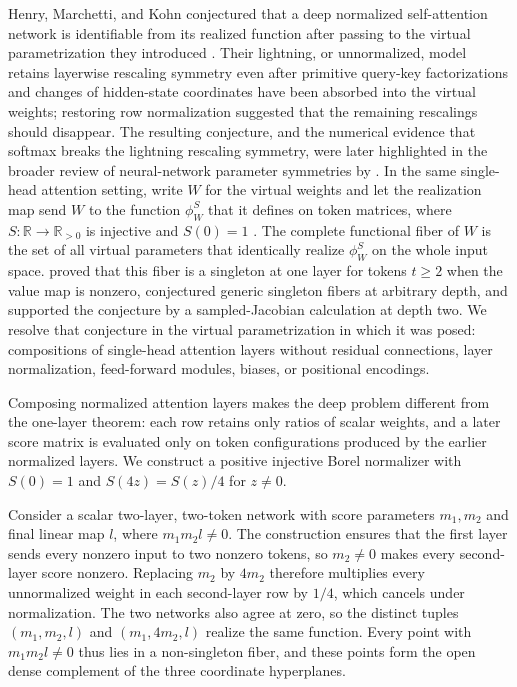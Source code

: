 \documentclass[mlmain]{jmlr}
\newcommand{\R}{\mathbb{R}}
\begin{document}
Henry, Marchetti, and Kohn conjectured that a deep normalized self-attention
network is identifiable from its realized function after passing to the
virtual parametrization they introduced \citep{henry2025}.  Their lightning,
or unnormalized, model retains layerwise rescaling symmetry even after primitive
query-key factorizations and changes of hidden-state coordinates have been
absorbed into the virtual weights; restoring row normalization suggested that
the remaining rescalings should disappear.  The resulting conjecture, and the
numerical evidence that softmax breaks the lightning rescaling symmetry, were later
highlighted in the broader review of neural-network parameter symmetries by
\citet{zhao2025}.  
In the same single-head attention setting, write
$W$ for the virtual weights and let the realization map send $W$ to the function
$\phi_W^S$ that it defines on token matrices, where
$S:\R\to\R_{>0}$ is injective and $S(0)=1$ \citep{henry2025}.  The complete functional fiber of
$W$ is the set of all virtual parameters that identically realize $\phi_W^S$ on the
whole input space.  \citet{henry2025} proved that this
fiber is a singleton at one layer for tokens $t\ge2$ when the value map is nonzero,
conjectured generic singleton fibers at arbitrary depth, and supported the
conjecture by a sampled-Jacobian calculation at depth two.  We
resolve that conjecture in the virtual parametrization in which it was posed:
compositions of single-head attention layers without residual connections,
layer normalization, feed-forward modules, biases, or positional encodings.

Composing normalized attention layers makes the deep problem different from
the one-layer theorem: each row retains only ratios of scalar weights, and a
later score matrix is evaluated only on token configurations produced by the
earlier normalized layers.  We construct a positive injective Borel normalizer
with $S(0)=1$ and $S(4z)=S(z)/4$ for $z\ne0$.  

Consider a scalar two-layer,
two-token network with score parameters $m_1,m_2$ and final linear map $l$,
where $m_1m_2l\ne0$.  The construction ensures that the first layer sends
every nonzero input to two nonzero tokens, so $m_2\ne0$ makes every
second-layer score nonzero.  Replacing $m_2$ by $4m_2$ therefore multiplies
every unnormalized weight in each second-layer row by $1/4$, which cancels
under normalization.  The two networks also agree at zero, so the distinct
tuples $(m_1,m_2,l)$ and $(m_1,4m_2,l)$ realize the same function.  Every
point with $m_1m_2l\ne0$ thus lies in a non-singleton fiber, and these points
form the open dense complement of the three coordinate hyperplanes.
\end{document}
